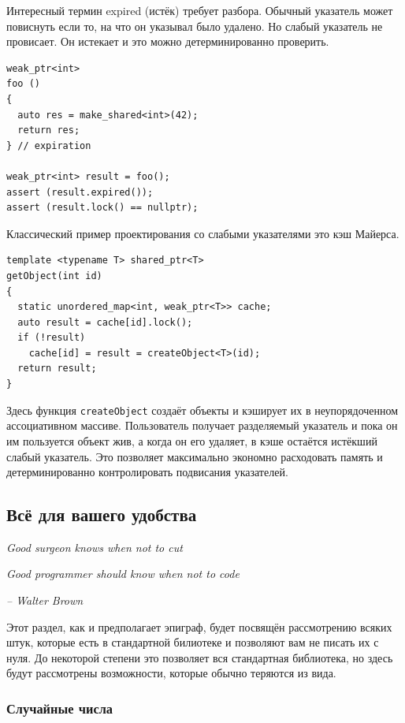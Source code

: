 \documentclass[a4paper,12pt,oneside]{article}
\begin{document}
Интересный термин expired (истёк) требует разбора. Обычный указатель может повиснуть если то, на что он указывал было удалено. Но слабый указатель не провисает. Он истекает и это можно детерминированно проверить.

\begin{lstlisting}
weak_ptr<int> 
foo () 
{
  auto res = make_shared<int>(42);
  return res;
} // expiration

weak_ptr<int> result = foo();
assert (result.expired());
assert (result.lock() == nullptr);
\end{lstlisting}

Классический пример проектирования со слабыми указателями это кэш Майерса.

\begin{lstlisting}
template <typename T> shared_ptr<T> 
getObject(int id) 
{
  static unordered_map<int, weak_ptr<T>> cache;
  auto result = cache[id].lock();
  if (!result) 
    cache[id] = result = createObject<T>(id); 
  return result;
}
\end{lstlisting}

Здесь функция \lstinline!createObject! создаёт объекты и кэширует их в неупорядоченном ассоциативном массиве. Пользователь получает разделяемый указатель и пока он им пользуется объект жив, а когда он его удаляет, в кэше остаётся истёкший слабый указатель. Это позволяет максимально экономно расходовать память и детерминированно контролировать подвисания указателей.

\pagebreak
\subsection{Всё для вашего удобства}\label{UtilityStdLib}

\hfill\textit{Good surgeon knows when not to cut}

\hfill\textit{Good programmer should know when not to code}{\vspace{0.5em}}

\hfill\textit{-- Walter Brown}

Этот раздел, как и предполагает эпиграф, будет посвящён рассмотрению всяких штук, которые есть в стандартной билиотеке и позволяют вам не писать их с нуля. До некоторой степени это позволяет вся стандартная библиотека, но здесь будут рассмотрены возможности, которые обычно теряются из вида.

\subsubsection{Случайные числа}\label{RandomNumbers}
\end{document}
